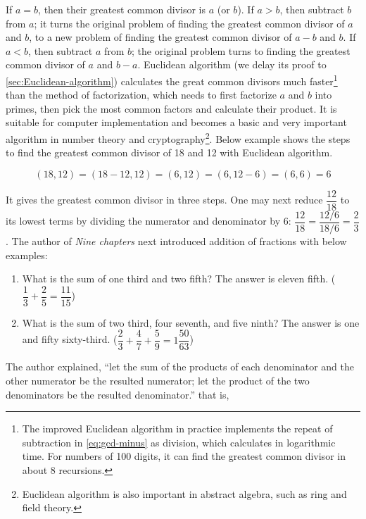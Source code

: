 \documentclass[b5paper]{article}
\begin{document}
If $a = b$, then their greatest common divisor is $a$ (or $b$). If $a > b$, then subtract $b$ from $a$; it turns the original problem of finding the greatest common divisor of $a$ and $b$, to a new problem of finding the greatest common divisor of $a - b$ and $b$. If $a < b$, then subtract $a$ from $b$; the original problem turns to finding the greatest common divisor of $a$ and $b - a$. Euclidean algorithm (we delay its proof to \cref{sec:Euclidean-algorithm}) calculates the great common divisors much faster\footnote{The improved Euclidean algorithm in practice implements the repeat of subtraction in \cref{eq:gcd-minus} as division, which calculates in logarithmic time. For numbers of 100 digits, it can find the greatest common divisor in about 8 recursions.} than the method of factorization, which needs to first factorize $a$ and $b$ into primes, then pick the most common factors and calculate their product. It is suitable for computer implementation and becomes a basic and very important algorithm in number theory and cryptography\footnote{Euclidean algorithm is also important in abstract algebra, such as ring and field theory.}. Below example shows the steps to find the greatest common divisor of 18 and 12 with Euclidean algorithm.

\[
(18, 12) = (18 - 12, 12) = (6, 12) = (6, 12 - 6) = (6, 6) = 6
\]

It gives the greatest common divisor in three steps. One may next reduce $\dfrac{12}{18}$ to its lowest terms by dividing the numerator and denominator by 6: $\dfrac{12}{18} = \dfrac{12/6}{18/6} = \dfrac{2}{3}$. The author of \emph{Nine chapters} next introduced addition of fractions with below examples:

\begin{enumerate}[1)]
\item What is the sum of one third and two fifth? The answer is eleven fifth. ($\dfrac{1}{3} + \dfrac{2}{5} = \dfrac{11}{15}$)
\item What is the sum of two third, four seventh, and five ninth? The answer is one and fifty sixty-third. ($\dfrac{2}{3} + \dfrac{4}{7} + \dfrac{5}{9} = 1\dfrac{50}{63}$)
\end{enumerate}

The author explained, \enquote{let the sum of the products of each denominator and the other numerator be the resulted numerator; let the product of the two denominators be the resulted denominator.} that is,
\end{document}
